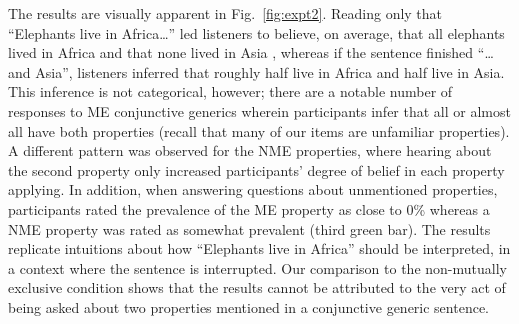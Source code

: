 \documentclass[10pt,letterpaper]{article}
\newcommand{\mh}[1]{{\textcolor{Blue}{[mh: #1]}}}
\begin{document}
The results are visually apparent in Fig.~\ref{fig:expt2}.
Reading only that ``Elephants live in Africa\ldots'' led listeners to believe, on average, that all elephants lived in Africa and that none lived in Asia , whereas if the sentence finished ``\ldots and Asia'', listeners inferred that roughly half live in Africa and half live in Asia.
This inference is not categorical, however; there are a notable number of responses to ME conjunctive generics wherein participants  infer that all or almost all have both properties (recall that many of our items are unfamiliar properties).
A different pattern was observed for the NME properties, where hearing about the second property only increased participants' degree of belief in each property applying.
In addition, when answering questions about unmentioned properties, participants rated the prevalence of the ME property as close to 0\% whereas a NME property was rated as somewhat prevalent (third green bar).
The results replicate intuitions about how ``Elephants live in Africa'' should be interpreted, in a context where the sentence is interrupted. 
Our comparison to the non-mutually exclusive condition shows that the results cannot be attributed to the very act of being asked about two properties mentioned in a conjunctive generic sentence.


\end{document}
